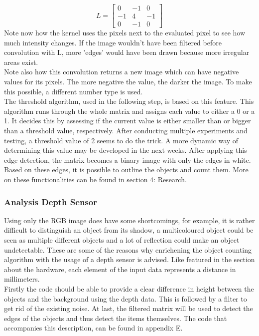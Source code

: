 \documentclass{article}
\begin{document}
\begin{equation}
L =\begin{bmatrix}
0&-1&0\\
-1&4&-1\\
0&-1&0
\end{bmatrix}
\end{equation}
\noindent Note now how the kernel uses the pixels next to the evaluated pixel to see how much intensity changes. If the image wouldn't have been filtered before convolution with L, more 'edges' would have been drawn because more irregular areas exist.\\
Note also how this convolution returns a new image which can have negative values for its pixels. The more negative the value, the darker the image. To make this possible, a different number type is used.\\
The threshold algorithm, used in the following step, is based on this feature. This algorithm runs through the whole matrix and assigns each value to either a 0 or a 1. It decides this by assessing if the current value is either smaller than or bigger than a threshold value, respectively. After conducting multiple experiments and testing, a threshold value of 2 seems to do the trick. A more dynamic way of determining this value may be developed in the next weeks. After applying this edge detection, the matrix becomes a binary image with only the edges in white. Based on these edges, it is possible to outline the objects and count them. More on these functionalities can be found  in section 4: Research. 

\subsubsection{Analysis Depth Sensor}
Using only the RGB image does have some shortcomings, for example, it is rather difficult to distinguish an object from its shadow, a multicoloured object could be seen as multiple different objects and a lot of reflection could make an object undetectable. These are some of the reasons why enrichening the object counting algorithm with the usage of a depth sensor is advised. Like featured in the section about the hardware, each element of the input data represents a distance in millimeters.\\
Firstly the code should be able to provide a clear difference in height between the objects and the background using the depth data. This is followed by a filter to get rid of the existing noise. At last, the filtered matrix will be used to detect the edges of the objects and thus detect the items themselves. The code that accompanies this description, can be found in appendix E.
 
\end{document}
